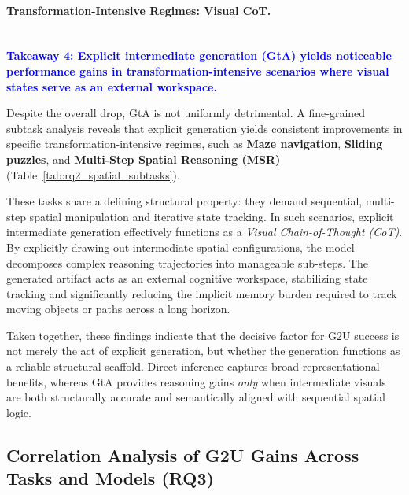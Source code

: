 \documentclass{article}
\theoremstyle{plain}
\theoremstyle{definition}
\theoremstyle{remark}
\begin{document}
\paragraph{Transformation-Intensive Regimes: Visual CoT.}
~\\
\textbf{\textcolor{blue}{Takeaway 4: Explicit intermediate generation (GtA) yields noticeable performance gains in transformation-intensive scenarios where visual states serve as an external workspace.}}

Despite the overall drop, GtA is not uniformly detrimental. A fine-grained subtask analysis reveals that explicit generation yields consistent improvements in specific transformation-intensive regimes, such as \textbf{Maze navigation}, \textbf{Sliding puzzles}, and \textbf{Multi-Step Spatial Reasoning (MSR)} (Table~\ref{tab:rq2_spatial_subtasks}). 

These tasks share a defining structural property: they demand sequential, multi-step spatial manipulation and iterative state tracking. In such scenarios, explicit intermediate generation effectively functions as a \emph{Visual Chain-of-Thought (CoT)}. By explicitly drawing out intermediate spatial configurations, the model decomposes complex reasoning trajectories into manageable sub-steps. The generated artifact acts as an external cognitive workspace, stabilizing state tracking and significantly reducing the implicit memory burden required to track moving objects or paths across a long horizon.

Taken together, these findings indicate that the decisive factor for G2U success is not merely the act of explicit generation, but whether the generation functions as a reliable structural scaffold. Direct inference captures broad representational benefits, whereas GtA provides reasoning gains \emph{only} when intermediate visuals are both structurally accurate and semantically aligned with sequential spatial logic.

\subsection{Correlation Analysis of G2U Gains Across Tasks and Models (RQ3)}
\label{sec:rq3}
\end{document}
